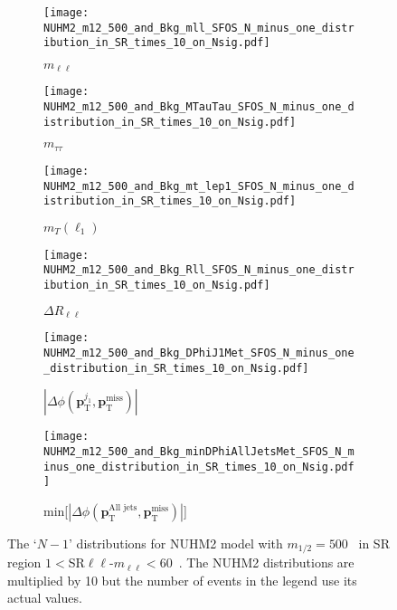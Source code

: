 \begin{figure}[htbp]
    \begin{center}
        \begin{subfigure}[b]{0.48\textwidth}
            \texttt{[image: NUHM2\_m12\_500\_and\_Bkg\_mll\_SFOS\_N\_minus\_one\_distribution\_in\_SR\_times\_10\_on\_Nsig.pdf]}
            \caption{$m_{\ell\ell}$}
            \label{fig:event_nuhm2_m12_500_mll_SFOS}
        \end{subfigure}
        \begin{subfigure}[b]{0.48\textwidth}
            \texttt{[image: NUHM2\_m12\_500\_and\_Bkg\_MTauTau\_SFOS\_N\_minus\_one\_distribution\_in\_SR\_times\_10\_on\_Nsig.pdf]}
            \caption{$m_{\tau\tau}$}
            \label{fig:event_nuhm2_m12_500_MTauTau_SFOS}
        \end{subfigure}
        \begin{subfigure}[b]{0.48\textwidth}
            \texttt{[image: NUHM2\_m12\_500\_and\_Bkg\_mt\_lep1\_SFOS\_N\_minus\_one\_distribution\_in\_SR\_times\_10\_on\_Nsig.pdf]}
            \caption{$m_{T}(\ell_{1})$}
            \label{fig:event_nuhm2_m12_500_mt_lep1_SFOS}
        \end{subfigure}
        \begin{subfigure}[b]{0.48\textwidth}
            \texttt{[image: NUHM2\_m12\_500\_and\_Bkg\_Rll\_SFOS\_N\_minus\_one\_distribution\_in\_SR\_times\_10\_on\_Nsig.pdf]}
            \caption{$\Delta R_{\ell\ell}$}
            \label{fig:event_nuhm2_m12_500_Rll_SFOS}
        \end{subfigure}
        \begin{subfigure}[b]{0.48\textwidth}
            \texttt{[image: NUHM2\_m12\_500\_and\_Bkg\_DPhiJ1Met\_SFOS\_N\_minus\_one\_distribution\_in\_SR\_times\_10\_on\_Nsig.pdf]}
            \caption{$|\Delta \phi(\mathbf{p}^{j_{1}}_{\mathrm{T}}, \mathbf{p}^{\mathrm{miss}}_{\mathrm{T}})|$}
            \label{fig:event_nuhm2_m12_500_DPhiJ1Met_SFOS}
        \end{subfigure}
        \begin{subfigure}[b]{0.48\textwidth}
            \texttt{[image: NUHM2\_m12\_500\_and\_Bkg\_minDPhiAllJetsMet\_SFOS\_N\_minus\_one\_distribution\_in\_SR\_times\_10\_on\_Nsig.pdf]}
            \caption{min[$|\Delta \phi(\mathbf{p}^{\textrm{All jets}}_{\mathrm{T}}, \mathbf{p}^{\mathrm{miss}}_{\mathrm{T}})|$]}
            \label{fig:event_nuhm2_m12_500_minDPhiAllJetsMet_SFOS}
        \end{subfigure}
    \end{center}
    \caption{The `$N-1$' distributions for NUHM2 model with $m_{1/2} = 500$~{\GeV} in SR region $1 < $SR$\ell \ell$-$m_{\ell \ell} < 60$~{\GeV}.
    The NUHM2 distributions are multiplied by 10 but the number of events in the legend use its actual values.}
    \label{fig:event_nuhm2_kinematic_in_SR_SFOS_2}
\end{figure}



